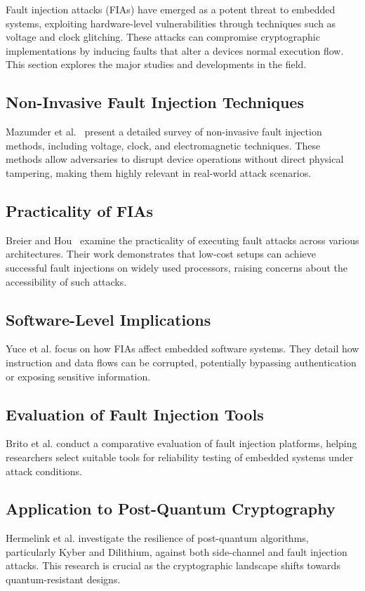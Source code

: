 Fault injection attacks (FIAs) have emerged as a potent threat to embedded systems, exploiting hardware-level vulnerabilities through techniques such as voltage and clock glitching. These attacks can compromise cryptographic implementations by inducing faults that alter a devices normal execution flow. This section explores the major studies and developments in the field.

\subsection*{Non-Invasive Fault Injection Techniques}
Mazumder et al.~\cite{mazumder2023comprehensive} present a detailed survey of non-invasive fault injection methods, including voltage, clock, and electromagnetic techniques. These methods allow adversaries to disrupt device operations without direct physical tampering, making them highly relevant in real-world attack scenarios.

\subsection*{Practicality of FIAs}
Breier and Hou~\cite{breier2022practical} examine the practicality of executing fault attacks across various architectures. Their work demonstrates that low-cost setups can achieve successful fault injections on widely used processors, raising concerns about the accessibility of such attacks.

\subsection*{Software-Level Implications}
Yuce et al.\cite{yuce2020fault} focus on how FIAs affect embedded software systems. They detail how instruction and data flows can be corrupted, potentially bypassing authentication or exposing sensitive information.



\subsection*{Evaluation of Fault Injection Tools}
Brito et al. \cite{brito2023evaluation} conduct a comparative evaluation of fault injection platforms, helping researchers select suitable tools for reliability testing of embedded systems under attack conditions.

\subsection*{Application to Post-Quantum Cryptography}
Hermelink et al. \cite{hermelink2023side} investigate the resilience of post-quantum algorithms, particularly Kyber and Dilithium, against both side-channel and fault injection attacks. This research is crucial as the cryptographic landscape shifts towards quantum-resistant designs.
